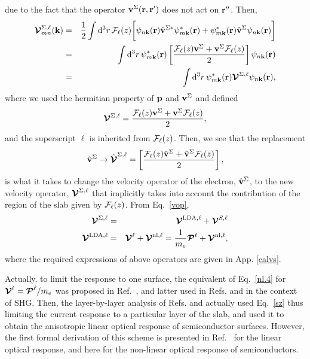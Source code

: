 \documentclass{article}
\begin{document}
due to the fact that the operator $\mathbf{v}^\Sigma(\mathbf{r},\mathbf{r}')$ does not act on
$\mathbf{r}''$. Then,
\begin{eqnarray}\label{nl.3}
\boldsymbol{\mathcal{\cal V}}^{\Sigma,\ell}_{mn}({\mathbf k})
&=&
\frac{1}{2}
\int \mathrm{d}^3 r\,
 {\mathbf{\cal F}}_\ell(z)
 \bigg[
\psi_{n\mathbf{k}}(\mathbf{r})
\hat{\mathbf{v}}^{\Sigma *}\psi^*_{m\mathbf{k}}(\mathbf{r})
+ 
\psi^*_{m\mathbf{k}}(\mathbf{r})\hat{\mathbf{v}}^\Sigma
\psi_{n\mathbf{k}}(\mathbf{r})
\bigg]
\nonumber\\
&=&
\int \mathrm{d}^3 r\,
\psi^*_{m\mathbf{k}}(\mathbf{r})
\left[\frac{{\mathbf{\cal F}}_\ell(z) \mathbf{v}^\Sigma +
\mathbf{v}^\Sigma {\mathbf{\cal F}}_\ell(z)}{2}\right]
\psi_{n\mathbf{k}}(\mathbf{r})
\nonumber\\
&=&
\int \mathrm{d}^3 r\,
\psi^*_{m\mathbf{k}}(\mathbf{r})
\boldsymbol{\mathcal{\cal V}}^{\Sigma,\ell}
\psi_{n\mathbf{k}}(\mathbf{r})
,
\end{eqnarray}
where we used the hermitian property of $\mathbf{p}$ and $\mathbf{v}^\Sigma$ and  defined
\begin{eqnarray}\label{nl.4}
\boldsymbol{\mathcal{\cal V}}^{\Sigma,\ell}
=
\frac{{\mathbf{\cal F}}_\ell(z) \mathbf{v}^\Sigma +
\mathbf{v}^\Sigma {\mathbf{\cal F}}_\ell(z)}{2}
,
\end{eqnarray} 
and the superscript $\ell$ is inherited from ${\mathbf{\cal F}}_\ell(z)$. 
Then,
we see that the replacement
\begin{equation}\label{vcali}
\hat{\mathbf{v}}^\Sigma \to \hat{\boldsymbol{\mathcal{\cal V}}}^{\Sigma,\ell}=\left[\frac{{\mathbf{\cal F}}_\ell(z) \hat{\mathbf{v}}^\Sigma +
\hat{\mathbf{v}}^\Sigma {\mathbf{\cal F}}_\ell(z)}{2}\right],
\end{equation} 
is what it takes to change the
velocity operator of the electron, $\hat{\mathbf{v}}^\Sigma$, to the new velocity
operator, $\boldsymbol{\mathcal{\cal V}}^{\Sigma,\ell}$
 that implicitly takes into account the
contribution of the region of the slab given by ${\mathbf{\cal F}}_\ell(z)$.
From Eq.~\eqref{vop},
\begin{eqnarray}\label{vopii}
\boldsymbol{\mathcal{\cal V}}^{\Sigma,\ell}
&=&
\boldsymbol{\mathcal{\cal V}}^{\mathrm{LDA},\ell}
+
\boldsymbol{\mathcal{\cal V}}^{S,\ell}
\nonumber\\
\boldsymbol{\mathcal{\cal V}}^{\mathrm{LDA},\ell}
&=&
\boldsymbol{\mathcal{\cal V}}^{\ell}
+
\boldsymbol{\mathcal{\cal V}}^{\mathrm{nl},\ell}
=
\frac{1}{m_e}
\boldsymbol{\mathcal{\cal P}}^{\ell}
+
\boldsymbol{\mathcal{\cal V}}^{\mathrm{nl},\ell}
,
\end{eqnarray}
where the required expressions of above operators
are given in 
App. \ref{calvs}.

Actually, 
to limit the response to one surface, 
the equivalent of Eq.~\eqref{nl.4} for $\boldsymbol{\mathcal{\cal V}}^\ell=\boldsymbol{\mathcal{\cal P}}^\ell/m_e$
 was proposed 
in Ref.~\cite{reining_microscopic_1994}, and latter used in Refs.
\cite{mendoza_ab_2001} 
and \cite{mejia_layer-by-layer_2004} in the context of SHG. Then, 
the layer-by-layer analysis of Refs. \cite{hogan_optical_2003} 
and \cite{castillo_layer-by-layer_2003}
actually used Eq.~\eqref{sz}
thus limiting the current response
to a particular layer of the slab, and used it to obtain the
anisotropic linear optical response of semiconductor surfaces.
However, the first formal derivation of this scheme is presented in
Ref.~\cite{mendoza_layer-by-layer_2006} for the linear optical response, and
here for the non-linear optical response of semiconductors.
\end{document}
